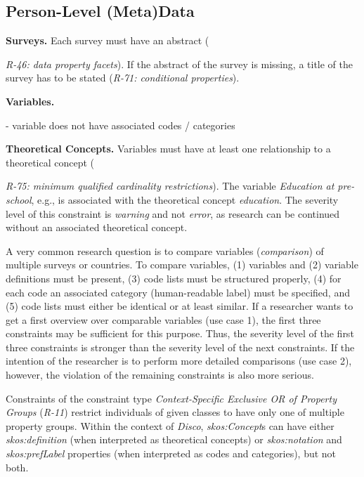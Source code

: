 \documentclass{llncs}
\begin{document}
\subsection{Person-Level (Meta)Data}

\textbf{Surveys.}
Each survey must have an abstract ({\emph{R-46: data property facets}). 
If the abstract of the survey is missing, a title of the survey has to be stated (\emph{R-71: conditional properties}).

\textbf{Variables.}

- variable does not have associated codes / categories

\textbf{Theoretical Concepts.}
Variables must have at least one relationship to a theoretical concept ({\emph{R-75: minimum qualified cardinality restrictions}).
The variable \emph{Education at pre-school}, e.g., is associated with the theoretical concept \emph{education}. 
The severity level of this constraint is \emph{warning} and not \emph{error}, as research can be continued without an associated theoretical concept.

A very common research question is to compare variables (\emph{comparison}) of multiple surveys or countries.
To compare variables, 
(1) variables and (2) variable definitions must be present,
(3) code lists must be structured properly,
(4) for each code an associated category (human-readable label) must be specified, and
(5) code lists must either be identical or at least similar.
If a researcher wants to get a first overview over comparable variables (use case 1), 
the first three constraints may be sufficient for this purpose.
Thus, the severity level of the first three constraints is stronger than the severity level of the next constraints.
If the intention of the researcher is to perform more detailed comparisons (use case 2), however, the violation of the remaining constraints is also more serious.

Constraints of the constraint type \emph{Context-Specific Exclusive OR of Property Groups} (\emph{R-11})
restrict individuals of given classes to have only one of multiple property groups.
Within the context of \emph{Disco}, \emph{skos:Concept}s can have either \emph{skos:definition} (when interpreted as theoretical concepts) or \emph{skos:notation} and \emph{skos:prefLabel} properties (when interpreted as codes and categories), but not both.

}}
\end{document}
